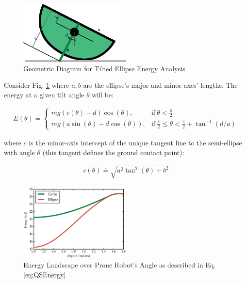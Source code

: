 \documentclass[letterpaper]{report}
\begin{document}
\begin{figure}[ht]
\centering
\includegraphics[width=0.5\textwidth]{QS_EnergyAnalysis.eps}
\caption{\label{f:QS_energyGeometry}Geometric Diagram for Tilted Ellipse Energy Analysis}
\end{figure}

Consider Fig. \ref{f:QS_energyGeometry} where $a,b$ are the ellipse's major and minor axes' lengths.
The energy at a given tilt angle $\theta$ will be:

\begin{align}
  E(\theta) =
    \begin{cases}
      mg (c(\theta)-d) \cos(\theta), & \text{if}\ \theta < \frac{\pi}{2} \\
      mg (a \sin(\theta) - d \cos(\theta) ), & \text{if}\ \frac{\pi}{2} \leq \theta < \frac{\pi}{2} + \tan^{-1}(d/a)
    \end{cases}
  \label{eq:QSEnergy}
\end{align}

where $c$ is the minor-axis intercept of the unique tangent line to the semi-ellipse with angle $\theta$ (this tangent defines the ground contact point):

\begin{align}
  c(\theta) \doteq \sqrt{a^2 \tan^2(\theta) + b^2}
\end{align}

\begin{figure}
\centering
\includegraphics[width=0.5\textwidth]{EnergyLandscape.eps}
\caption{\label{fig:QSEnergy}Energy Landscape over Prone Robot's Angle as described in Eq. \ref{eq:QSEnergy}}
\end{figure}
\end{document}
